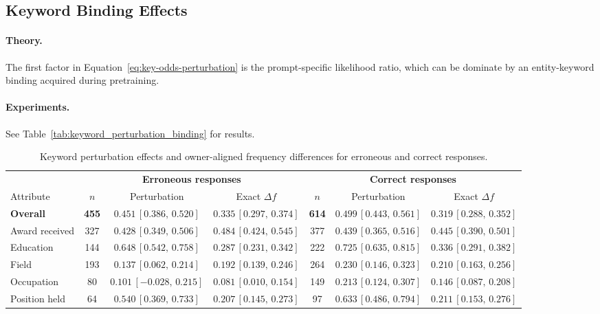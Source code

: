 \subsection{Keyword Binding Effects}
\paragraph{Theory.}
The first factor in Equation~\ref{eq:key-odds-perturbation} is the prompt-specific likelihood ratio, which can be dominate by an entity-keyword binding acquired during pretraining. 
\paragraph{Experiments.}
See Table~\ref{tab:keyword_perturbation_binding} for results.

\begin{table}[t]
\centering
\caption{Keyword perturbation effects and owner-aligned frequency differences for erroneous and correct responses.}
\label{tab:keyword_perturbation_binding}
\label{tab:free_generation_binding}
\small
\setlength{\tabcolsep}{1.5pt}
\begin{tabular}{lccc|ccc}
\toprule
& \multicolumn{3}{c}{\textbf{Erroneous responses}}
& \multicolumn{3}{c}{\textbf{Correct responses}} \\
\cmidrule(lr){2-4}\cmidrule(lr){5-7}
Attribute
& $n$ & Perturbation & Exact $\Delta f$
& $n$ & Perturbation & Exact $\Delta f$ \\
\midrule
\textbf{Overall}
& \textbf{455}
& $\mathbf{0.451}$\,{\scriptsize $[0.386,\,0.520]$}
& $\mathbf{0.335}$\,{\scriptsize $[0.297,\,0.374]$}
& \textbf{614}
& $\mathbf{0.499}$\,{\scriptsize $[0.443,\,0.561]$}
& $\mathbf{0.319}$\,{\scriptsize $[0.288,\,0.352]$} \\
Award received
& 327
& $0.428$\,{\scriptsize $[0.349,\,0.506]$}
& $0.484$\,{\scriptsize $[0.424,\,0.545]$}
& 377
& $0.439$\,{\scriptsize $[0.365,\,0.516]$}
& $0.445$\,{\scriptsize $[0.390,\,0.501]$} \\
Education
& 144
& $0.648$\,{\scriptsize $[0.542,\,0.758]$}
& $0.287$\,{\scriptsize $[0.231,\,0.342]$}
& 222
& $0.725$\,{\scriptsize $[0.635,\,0.815]$}
& $0.336$\,{\scriptsize $[0.291,\,0.382]$} \\
Field
& 193
& $0.137$\,{\scriptsize $[0.062,\,0.214]$}
& $0.192$\,{\scriptsize $[0.139,\,0.246]$}
& 264
& $0.230$\,{\scriptsize $[0.146,\,0.323]$}
& $0.210$\,{\scriptsize $[0.163,\,0.256]$} \\
Occupation
& 80
& $0.101$\,{\scriptsize $[-0.028,\,0.215]$}
& $0.081$\,{\scriptsize $[0.010,\,0.154]$}
& 149
& $0.213$\,{\scriptsize $[0.124,\,0.307]$}
& $0.146$\,{\scriptsize $[0.087,\,0.208]$} \\
Position held
& 64
& $0.540$\,{\scriptsize $[0.369,\,0.733]$}
& $0.207$\,{\scriptsize $[0.145,\,0.273]$}
& 97
& $0.633$\,{\scriptsize $[0.486,\,0.794]$}
& $0.211$\,{\scriptsize $[0.153,\,0.276]$} \\
\bottomrule
\end{tabular}


\end{table}
